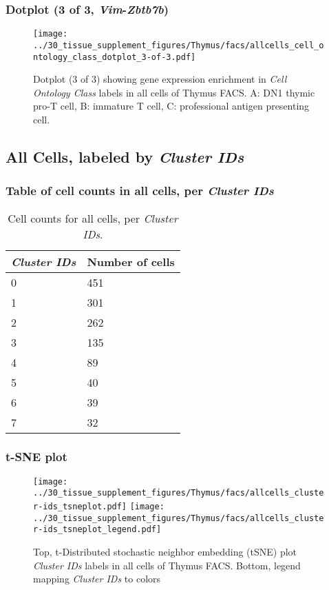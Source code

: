 \clearpage

\subsubsection{Dotplot (3 of 3, \emph{Vim}-\emph{Zbtb7b})}
\begin{figure}[h]
\centering
\texttt{[image: ../30\_tissue\_supplement\_figures/Thymus/facs/allcells\_cell\_ontology\_class\_dotplot\_3-of-3.pdf]}

\caption{ Dotplot (3 of 3)  showing gene expression enrichment in \emph{Cell Ontology Class} labels in all cells of Thymus FACS. A: DN1 thymic pro-T cell, B: immature T cell, C: professional antigen presenting cell.}
\end{figure}


\clearpage

\subsection{All Cells, labeled by \emph{Cluster IDs}}
\subsubsection{Table of cell counts in all cells, per \emph{Cluster IDs}}\begin{table}[h]
\centering
\label{my-label}
\begin{tabular}{@{}ll@{}}
\toprule

\emph{Cluster IDs}& Number of cells \\ \midrule
0 & 451 \\

1 & 301 \\

2 & 262 \\

3 & 135 \\

4 & 89 \\

5 & 40 \\

6 & 39 \\

7 & 32 \\
\bottomrule
\end{tabular}
\caption{Cell counts for all cells, per \emph{Cluster IDs}.}
\end{table}

\clearpage
\subsubsection{t-SNE plot}
\begin{figure}[h]
\centering
\texttt{[image: ../30\_tissue\_supplement\_figures/Thymus/facs/allcells\_cluster-ids\_tsneplot.pdf]}
\texttt{[image: ../30\_tissue\_supplement\_figures/Thymus/facs/allcells\_cluster-ids\_tsneplot\_legend.pdf]}
\caption{Top, t-Distributed stochastic neighbor embedding (tSNE) plot  \emph{Cluster IDs} labels in all cells of Thymus FACS. Bottom, legend mapping \emph{Cluster IDs} to colors}
\end{figure}


